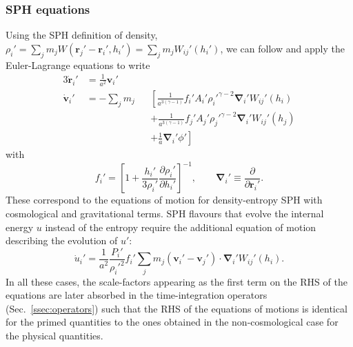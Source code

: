 \subsubsection{SPH equations}

Using the SPH definition of density,
$\rho_i' = \sum_jm_jW(\mathbf{r}_{j}'-\mathbf{r}_{i}',h_i') =
\sum_jm_jW_{ij}'(h_i')$, we can follow \cite{Price2012} and apply the
Euler-Lagrange equations to write
\begin{alignat}{3}
  \dot{\mathbf{r}}_i'&= \frac{1}{a^2} \mathbf{v}_i'&  \label{eq:cosmo_eom_r} \\
  \dot{\mathbf{v}}_i' &= -\sum_j m_j &&\left[\frac{1}{a^{3(\gamma-1)}}f_i'A_i'\rho_i'^{\gamma-2}\mathbf{\nabla}_i'W_{ij}'(h_i)\right. \nonumber\\
  &   && + \left. \frac{1}{a^{3(\gamma-1)}}f_j'A_j'\rho_j'^{\gamma-2}\mathbf{\nabla}_i'W_{ij}'(h_j)\right. \nonumber\\
  &   && + \left. \frac{1}{a}\mathbf{\nabla}_i'\phi'\right] \label{eq:cosmo_eom_v}
\end{alignat}
with
\begin{equation}
    f_i' = \left[1 + \frac{h_i'}{3\rho_i'}\frac{\partial
      \rho_i'}{\partial h_i'}\right]^{-1}, \qquad \mathbf{\nabla}_i'
  \equiv \frac{\partial}{\partial \mathbf{r}_{i}'}. \nonumber
\end{equation}
These correspond to the equations of motion for density-entropy SPH
\citep[e.g. eq. 14 of][]{Hopkins2013} with cosmological and
gravitational terms. SPH flavours that evolve the internal energy $u$ instead of the
entropy require the additional equation of motion describing the evolution of
$u'$:
\begin{equation}
  \dot{u}_i' = \frac{1}{a^2}\frac{P_i'}{\rho_i'^2} f_i'\sum_jm_j\left(\mathbf{v}_i' -
    \mathbf{v}_j'\right)\cdot\mathbf{\nabla}_i'W_{ij}'(h_i).
  \label{eq:cosmo_eom_u}
\end{equation}
In all these cases, the scale-factors appearing as the first term on
the RHS of the equations are later absorbed in the time-integration
operators (Sec.~\ref{ssec:operators}) such that the RHS of the
equations of motions is identical for the primed quantities to the
ones obtained in the non-cosmological case for the physical
quantities.

